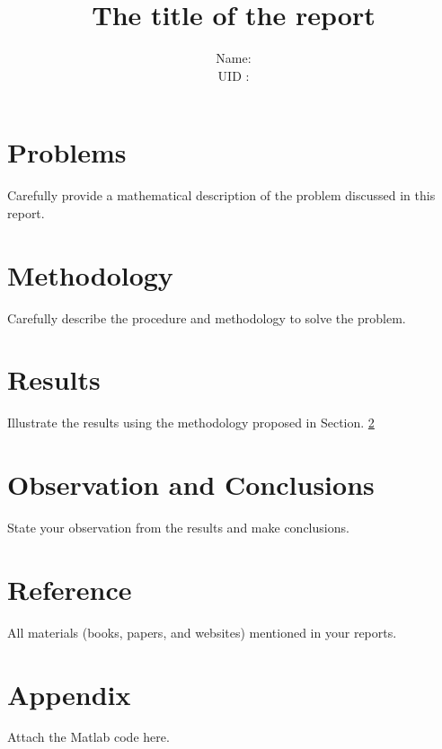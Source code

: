 \documentclass[letter,12pt]{article}
\title{The title of the report}
\author{Name:  \\
             UID :
           }
\date{}
\begin{document}
\maketitle
{}

\section{Problems}
Carefully provide a mathematical description of the problem discussed in this report. 

\section{Methodology}
\label{sec:method}
Carefully describe the procedure and methodology to solve the problem. 

\section{Results}
Illustrate the results using the methodology proposed in Section. \ref{sec:method}

\section{Observation and Conclusions}
State your observation from the results and make conclusions. 

\section*{Reference}
All materials (books, papers, and websites) mentioned in your reports.   
\section*{Appendix}
Attach the Matlab code here.
\end{document}
